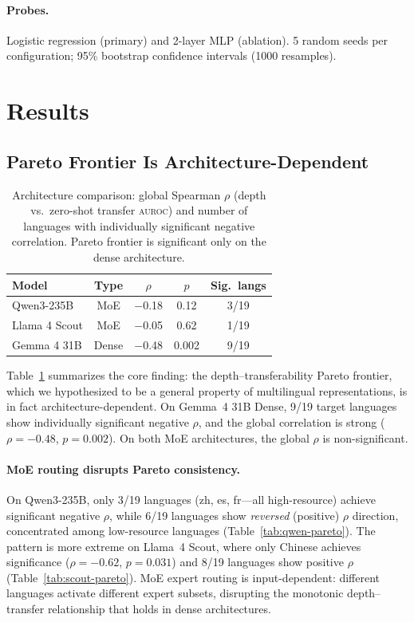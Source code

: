 \documentclass[11pt,a4paper]{article}
\newcommand{\auroc}{\textsc{auroc}}
\begin{document}
\paragraph{Probes.}
Logistic regression (primary) and 2-layer MLP (ablation).
5 random seeds per configuration; 95\% bootstrap confidence intervals (1000 resamples).

\section{Results}
\label{sec:results}

\subsection{Pareto Frontier Is Architecture-Dependent}
\label{sec:pareto-results}

\begin{table}[t]
\centering
\small
\begin{tabular}{lcccc}
\toprule
\textbf{Model} & \textbf{Type} & \textbf{$\rho$} & \textbf{$p$} & \textbf{Sig.\ langs} \\
\midrule
Qwen3-235B & MoE & $-$0.18 & 0.12 & 3/19 \\
Llama 4 Scout & MoE & $-$0.05 & 0.62 & 1/19 \\
Gemma 4 31B & Dense & $-$0.48 & 0.002 & 9/19 \\
\bottomrule
\end{tabular}
\caption{Architecture comparison: global Spearman $\rho$ (depth vs.\ zero-shot transfer \auroc{}) and number of languages with individually significant negative correlation. Pareto frontier is significant only on the dense architecture.}
\label{tab:arch-comparison}
\end{table}

Table~\ref{tab:arch-comparison} summarizes the core finding: the depth--transferability Pareto frontier, which we hypothesized to be a general property of multilingual representations, is in fact architecture-dependent.
On Gemma~4 31B Dense, 9/19 target languages show individually significant negative $\rho$, and the global correlation is strong ($\rho{=}{-}0.48$, $p{=}0.002$).
On both MoE architectures, the global $\rho$ is non-significant.

\paragraph{MoE routing disrupts Pareto consistency.}
On Qwen3-235B, only 3/19 languages (zh, es, fr---all high-resource) achieve significant negative $\rho$, while 6/19 languages show \emph{reversed} (positive) $\rho$ direction, concentrated among low-resource languages (Table~\ref{tab:qwen-pareto}).
The pattern is more extreme on Llama~4 Scout, where only Chinese achieves significance ($\rho{=}{-}0.62$, $p{=}0.031$) and 8/19 languages show positive $\rho$ (Table~\ref{tab:scout-pareto}).
MoE expert routing is input-dependent: different languages activate different expert subsets, disrupting the monotonic depth--transfer relationship that holds in dense architectures.
\end{document}
